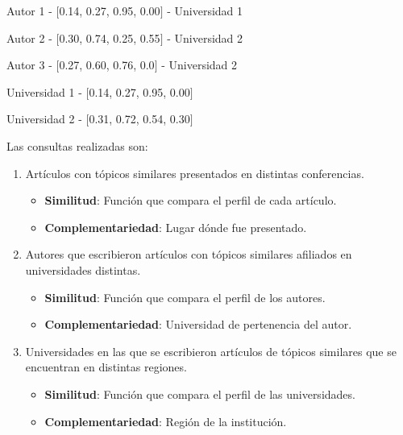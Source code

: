 \begin{description}
 \item[Autor - Topic Profile - Universidad]
 \item Autor 1 - $[$0.14, 0.27, 0.95, 0.00$]$ - Universidad 1
 \item Autor 2 - $[$0.30, 0.74, 0.25, 0.55$]$ - Universidad 2
 \item Autor 3 - $[$0.27, 0.60, 0.76, 0.0$]$ - Universidad 2
\end{description}

\begin{description}
 \item[Universidad - Topic Profile]
 \item Universidad 1 - $[$0.14, 0.27, 0.95, 0.00$]$
 \item Universidad 2 - $[$0.31, 0.72, 0.54, 0.30$]$
\end{description}

Las consultas realizadas son:
\begin{enumerate}
	\item
		Artículos con tópicos similares presentados en distintas conferencias.
		\begin{itemize}
			\item \textbf{Similitud}: Función que compara el perfil de cada artículo.
			\item \textbf{Complementariedad}: Lugar dónde fue presentado.
		\end{itemize}

	\item
	Autores que escribieron artículos con tópicos similares afiliados en universidades distintas.
	\begin{itemize}
		\item \textbf{Similitud}: Función que compara el perfil de los autores.
		\item \textbf{Complementariedad}: Universidad de pertenencia del autor.
	\end{itemize}

	\item 
	Universidades en las que se escribieron artículos de tópicos similares que se encuentran en distintas regiones. 
	\begin{itemize}
		\item \textbf{Similitud}: Función que compara el perfil de las universidades.
		\item \textbf{Complementariedad}: Región de la institución.
	\end{itemize}
\end {enumerate}


